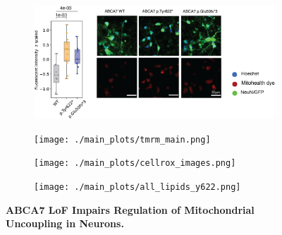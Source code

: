 \begin{figure}[H]
\begin{subfigure}[t]{.2\textwidth}
    \end{subfigure}   
    \begin{subfigure}[t]{.45\textwidth}
        \caption{}
        \includegraphics[width=\textwidth]{./extended_plots/mitohealth_dye.png}        
    \end{subfigure}    
    \begin{subfigure}[t]{.35\textwidth}
        \caption{}
        \texttt{[image: ./main\_plots/tmrm\_main.png]}        %
    \end{subfigure}    
    \hspace{.25cm}
    \begin{subfigure}[t]{.35\textwidth}
        \caption{}
        \texttt{[image: ./main\_plots/cellrox\_images.png]}        
    \end{subfigure}  
    \hspace{.5cm}
    \begin{subfigure}[t]{.25\textwidth}
        \caption{}
        \texttt{[image: ./main\_plots/all\_lipids\_y622.png]}        
    \end{subfigure}  
    \caption{
        \textbf{ABCA7 LoF Impairs Regulation of Mitochondrial Uncoupling in Neurons.}\\
    }
    \label{fig:main_mitochondrial}
\end{figure}
